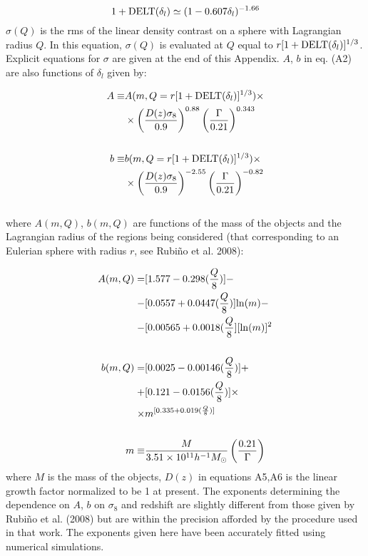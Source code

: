 \begin{equation}
1+{\rm DELT}(\delta_l) \simeq (1-0.607\delta_l)^{-1.66}   \label{eq:eqA4}
\end{equation}
$\sigma(Q)$ is the rms of the linear density contrast on a sphere with Lagrangian radius $Q$. In this equation, $\sigma(Q)$ is evaluated 
at $Q$ equal to $r[1+{\rm DELT}(\delta_l)]^{1/3}$. Explicit equations for $\sigma$ are given at the end of this Appendix.
$A$, $b$ in eq. (A2) are also functions of $\delta_l$ given by:

\begin{eqnarray}
 A \equiv &A(m,Q=r[1+{\rm DELT}(\delta_l)]^{1/3})  \times  \\
 &\times \left(\frac{D(z)\sigma_8}{0.9}\right)^{0.88} \left(\frac{\Gamma}{0.21}\right)^{0.343} \nonumber \\
 \nonumber\\
 b \equiv &b(m,Q=r[1+{\rm DELT}(\delta_l)]^{1/3})  \times   \\
 & \times \left(\frac{D(z)\sigma_8}{0.9}\right)^{-2.55} \left(\frac{\Gamma}{0.21}\right)^{-0.82} \nonumber \label{eq:eqA5}
\end{eqnarray} 
\\
where $A(m,Q)$, $b(m,Q)$ are functions of the mass of the objects and the Lagrangian radius of the regions being considered (that 
corresponding to an Eulerian sphere with radius $r$, see Rubi\~no et al. 2008):

\begin{eqnarray}
A(m,Q) = &[1.577 - 0.298 (\frac{Q}{8})] - \\
- &[0.0557 + 0.0447 (\frac{Q}{8})] {\rm ln}(m) -\nonumber\\
- &[0.00565 + 0.0018(\frac{Q}{8}][{\rm ln}(m)]^2\nonumber\\
\nonumber\\
b(m,Q) = &[0.0025 - 0.00146 (\frac{Q}{8})] + \\
+ &[0.121 - 0.0156(\frac{Q}{8})] \times \nonumber \\
\times & m^{[0.335 + 0.019 (\frac{Q}{8})]} \nonumber\\
\nonumber\\
m \equiv &\frac{M}{3.51 \times 10^{11} h^{-1}M_{\odot}}\left(\frac{0.21}{\Gamma}\right)    \label{eq:eqA6}
\end{eqnarray}
where $M$ is the mass of the objects, $D(z)$ in equations A5,A6 is the linear growth factor normalized to be 1 at present. The exponents determining the dependence on $A$, $b$ on $\sigma_8$ and redshift are slightly different from those given by Rubi\~no et al. (2008) but are within the precision afforded by the procedure used in that work. The exponents given here have been accurately fitted using numerical simulations. 

